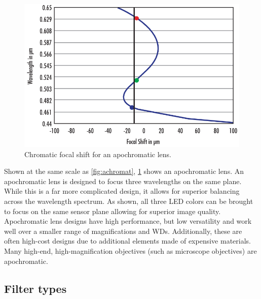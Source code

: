 \documentclass[10pt]{article}
\begin{document}
\begin{multicols}{2}
\begin{figure}[H]
    \centering
    \includegraphics[width=0.8\linewidth]{Images/Week 1/apochromat.png}
    \caption{Chromatic focal shift for an apochromatic lens.}
    \label{fig:apochromat}
\end{figure}
Shown at the same scale as \ref{fig:achromat}, \ref{fig:apochromat} shows an apochromatic lens. An apochromatic lens is designed to focus three wavelengths on the same plane. While this is a far more complicated design, it allows for superior balancing across the wavelength spectrum. As shown, all three LED colors can be brought to focus on the same sensor plane allowing for superior image quality. Apochromatic lens designs have high performance, but low versatility and work well over a smaller range of magnifications and WDs. Additionally, these are often high-cost designs due to additional elements made of expensive materials. Many high-end, high-magnification objectives (such as microscope objectives) are apochromatic.

\subsection{Filter types}

\end{multicols}
\end{document}
